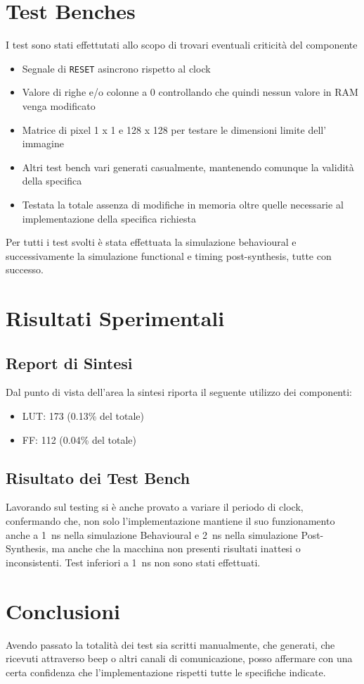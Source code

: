 \documentclass{article}
\begin{document}
\newpage

\section{Test Benches}
\label{test}

I test sono stati effettutati allo scopo di trovari eventuali criticità del componente

\begin{itemize}
\item Segnale di \texttt{RESET} asincrono rispetto al clock
\item Valore di righe e/o colonne a 0 controllando che quindi nessun valore in RAM venga modificato
\item Matrice di pixel 1 x 1 e 128 x 128 per testare le dimensioni limite dell' immagine
\item Altri test bench vari generati casualmente, mantenendo comunque la validità della specifica
\item Testata la totale assenza di modifiche in memoria oltre quelle necessarie al implementazione della specifica richiesta
\end{itemize}

Per tutti i test svolti è stata effettuata la simulazione behavioural e successivamente la simulazione functional e timing post-synthesis, tutte con successo.

\section{Risultati Sperimentali}
\label{risultati}

\subsection{Report di Sintesi}

Dal punto di vista dell'area la sintesi riporta il seguente utilizzo dei componenti:
\begin{itemize}
\item LUT: 173 (0.13\% del totale)
\item FF: 112 (0.04\% del totale)
\end{itemize}

\subsection{Risultato dei Test Bench}

Lavorando sul testing si è anche provato a variare il periodo di clock, confermando che, non solo l'implementazione mantiene il suo funzionamento anche a \SI{1}{\ns} nella simulazione Behavioural e \SI{2}{\ns} nella simulazione Post-Synthesis, ma anche che la macchina non presenti risultati inattesi o inconsistenti. Test inferiori a \SI{1}{\ns} non sono stati effettuati.

\section{Conclusioni}

Avendo passato la totalità dei test sia scritti manualmente, che generati, che ricevuti attraverso beep o altri canali di comunicazione, posso affermare con una certa confidenza che l'implementazione rispetti tutte le specifiche indicate.
\end{document}

